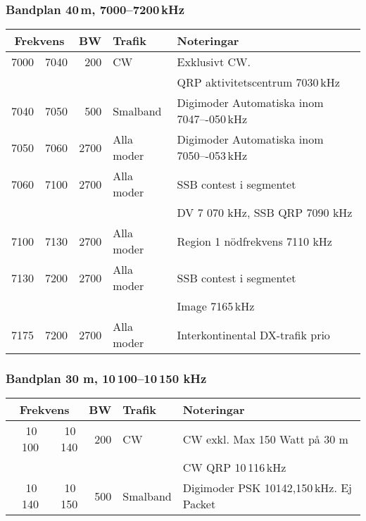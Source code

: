 \subsubsection{Bandplan 40\,m, 7000--7200\,kHz}
\begin{tabular}{rrrll}
\multicolumn{2}{c}{\textbf{Frekvens}} & \textbf{BW} & \textbf{Trafik} & \textbf{Noteringar} \\ \hline
7000 & 7040 & 200  & CW         & Exklusivt CW.                             \\
     &      &      &            & QRP aktivitetscentrum 7030\,kHz           \\ \hline
7040 & 7050 & 500  & Smalband   & Digimoder Automatiska inom 7047–-050\,kHz \\ \hline
7050 & 7060 & 2700 & Alla moder & Digimoder Automatiska inom 7050–-053\,kHz \\ \hline
7060 & 7100 & 2700 & Alla moder & SSB contest i segmentet                   \\
     &      &      &            & DV 7 070 kHz, SSB QRP 7090 kHz            \\ \hline
7100 & 7130 & 2700 & Alla moder & Region 1 nödfrekvens 7110 kHz             \\ \hline
7130 & 7200 & 2700 & Alla moder & SSB contest i segmentet                   \\
     &      &      &            & Image 7165\,kHz                           \\ \hline
7175 & 7200 & 2700 & Alla moder & Interkontinental DX-trafik prio           \\ \hline
\end{tabular}

\subsubsection{Bandplan 30 m, 10\,100--10\,150 kHz}
\begin{tabular}{rrrll}
\multicolumn{2}{c}{\textbf{Frekvens}} & \textbf{BW} & \textbf{Trafik} & \textbf{Noteringar} \\ \hline
10\,100 & 10\,140 & 200 & CW       & CW exkl. Max 150 Watt på 30 m           \\
        &         &     &          & CW QRP 10\,116\,kHz                     \\ \hline
10\,140 & 10\,150 & 500 & Smalband & Digimoder PSK 10142,150\,kHz. Ej Packet \\ \hline
\end{tabular}

